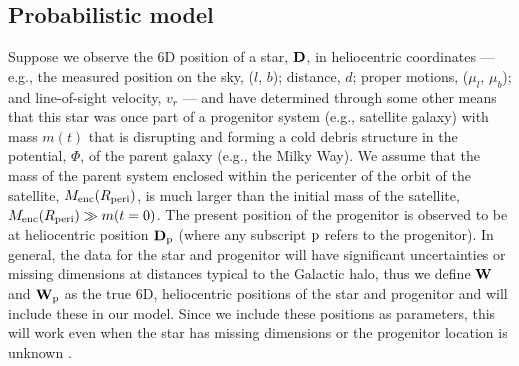 \documentclass[letterpaper,12pt,preprint]{aastex}
\newcommand{\D}{{\bf D}}
\newcommand{\W}{{\bf W}}
\newcommand{\sat}{{\rm p}}
\begin{document}
\subsection{Probabilistic model}
Suppose we observe the 6D position of a star, $\D$, in heliocentric coordinates --- e.g., the measured position on the sky, ($l$, $b$); distance, $d$; proper motions, ($\mu_l$, $\mu_b$); and line-of-sight velocity, $v_r$ --- and have determined through some other means that this star was once part of a progenitor system (e.g., satellite galaxy) with mass $m(t)$ that is disrupting and forming a cold debris structure in the potential, $\Phi$, of the parent galaxy (e.g., the Milky Way). We assume that the mass of the parent system enclosed within the pericenter of the orbit of the satellite, $M_{\rm enc}(R_{\rm peri})$, is much larger than the initial mass of the satellite, $M_{\rm enc}(R_{\rm peri})\gg m(t=0)$. The present position of the progenitor is observed to be at heliocentric position $\D_\sat$ (where any subscript $\sat$ refers to the progenitor). In general, the data for the star and progenitor will have significant uncertainties or missing dimensions at distances typical to the Galactic halo, thus we define $\W$ and $\W_\sat$ as the true 6D, heliocentric positions of the star and progenitor and will include these in our model. Since we include these positions as parameters, this will work even when the star has missing dimensions or the progenitor location is unknown \citep[as in the Orphan stream,][]{belokurov07}.
\end{document}
